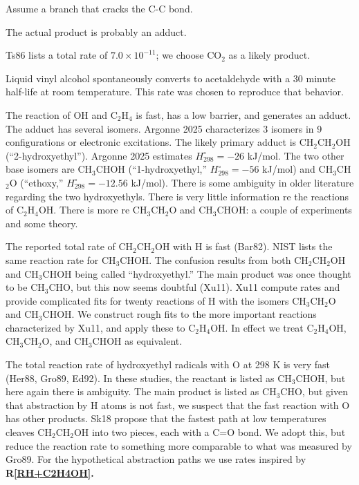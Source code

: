 \documentclass[12pt,landscape]{article}
\newcounter{reaction}
\begin{document}
  Assume a branch that cracks the C-C bond. 

  The actual product is probably an adduct.   

 Ts86 lists a total rate of $7.0\!\times\! 10^{-11}$; we choose CO$_2$ as a likely product. 

 Liquid vinyl alcohol spontaneously converts to acetaldehyde with a 30 minute half-life at room temperature. 
This rate was chosen to reproduce that behavior.  

 The reaction of OH and C$_2$H$_4$ is fast, has a low barrier, and generates an adduct.
The adduct has several isomers.  Argonne 2025 characterizes 3 isomers in 9 configurations or electronic excitations.
The likely primary adduct is CH$_2$CH$_2$OH (``2-hydroxyethyl'').   Argonne 2025 estimates $H^{\circ}_{298} = -26$ kJ/mol.
The two other base isomers are CH$_3$CHOH (``1-hydroxyethyl,'' $H^{\circ}_{298} = -56$ kJ/mol) and CH$_3$CH$_2$O  (``ethoxy,'' $H^{\circ}_{298}=-12.56$ kJ/mol). 
There is some ambiguity in older literature regarding the two hydroxyethyls.
 There is very little information re the reactions of C$_2$H$_4$OH.
There is more re CH$_3$CH$_2$O and CH$_3$CHOH:  a couple of experiments and some theory. 

The reported total rate of CH$_2$CH$_2$OH with H is fast (Bar82).
NIST lists the same reaction rate for CH$_3$CHOH.
The confusion results from both CH$_2$CH$_2$OH and CH$_3$CHOH being called ``hydroxyethyl.''  
The main product was once thought to be CH$_3$CHO, but this now seems doubtful (Xu11). 
  Xu11 compute rates and provide complicated fits for twenty reactions of H with the isomers CH$_3$CH$_2$O and CH$_3$CHOH.
 We construct rough fits to the more important reactions characterized by Xu11, and apply these to C$_2$H$_4$OH.
 In effect we treat C$_2$H$_4$OH, CH$_3$CH$_2$O, and CH$_3$CHOH as equivalent.  
 
The total reaction rate of hydroxyethyl radicals with O at 298 K is very fast (Her88, Gro89, Ed92).
In these studies, the reactant is listed as CH$_3$CHOH, but here again there is ambiguity. 
The main product is listed as CH$_3$CHO, but given that abstraction by H atoms is not fast, we suspect that the fast reaction with O has other products.
Sk18 propose that the fastest path at low temperatures cleaves CH$_2$CH$_2$OH into two pieces, each with a C=O bond.
We adopt this, but reduce the reaction rate to something more comparable to what was measured by Gro89. 
For the hypothetical abstraction paths we use rates inspired by {\bf R\ref{RH+C2H4OH}.}
\end{document}
